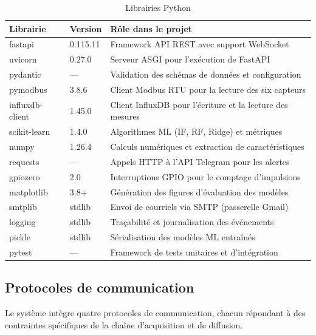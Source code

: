 \begin{table}[H]
\centering
\renewcommand{\arraystretch}{1.45}
\caption{Librairies Python}
\label{tab:libs_python}
\begin{tabular}{|p{}|p{}|p{}|}
\hline
\rowcolor{gray!25}
\textbf{Librairie} & \textbf{Version} & \textbf{Rôle dans le projet} \\
\hline
fastapi & 0.115.11 & Framework API REST avec support WebSocket \\
\hline
uvicorn & 0.27.0 & Serveur ASGI pour l'exécution de FastAPI \\
\hline
pydantic & --- & Validation des schémas de données et configuration \\
\hline
pymodbus & 3.8.6 & Client Modbus RTU pour la lecture des six capteurs \\
\hline
influxdb-client & 1.45.0 & Client InfluxDB pour l'écriture et la lecture des mesures \\
\hline
scikit-learn & 1.4.0 & Algorithmes ML (IF, RF, Ridge) et métriques \\
\hline
numpy & 1.26.4 & Calculs numériques et extraction de caractéristiques \\
\hline
requests & --- & Appels HTTP à l'API Telegram pour les alertes \\
\hline
gpiozero & 2.0 & Interruptions GPIO pour le comptage d'impulsions \\
\hline
matplotlib & 3.8+ & Génération des figures d'évaluation des modèles \\
\hline
smtplib & stdlib & Envoi de courriels via SMTP (passerelle Gmail) \\
\hline
logging & stdlib & Traçabilité et journalisation des événements \\
\hline
pickle & stdlib & Sérialisation des modèles ML entraînés \\
\hline
pytest & --- & Framework de tests unitaires et d'intégration \\
\hline
\end{tabular}
\end{table}

\subsection{Protocoles de communication}

Le système intègre quatre protocoles de communication, chacun répondant à des contraintes spécifiques de la chaîne d'acquisition et de diffusion.

